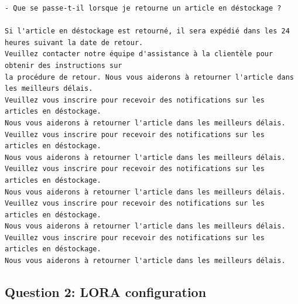 \documentclass[a4paper]{article}
\begin{document}
\begin{verbatim}
- Que se passe-t-il lorsque je retourne un article en déstockage ? 

Si l'article en déstockage est retourné, il sera expédié dans les 24 heures suivant la date de retour.
Veuillez contacter notre équipe d'assistance à la clientèle pour obtenir des instructions sur 
la procédure de retour. Nous vous aiderons à retourner l'article dans les meilleurs délais.
Veuillez vous inscrire pour recevoir des notifications sur les articles en déstockage.
Nous vous aiderons à retourner l'article dans les meilleurs délais.
Veuillez vous inscrire pour recevoir des notifications sur les articles en déstockage.
Nous vous aiderons à retourner l'article dans les meilleurs délais.
Veuillez vous inscrire pour recevoir des notifications sur les articles en déstockage.
Nous vous aiderons à retourner l'article dans les meilleurs délais.
Veuillez vous inscrire pour recevoir des notifications sur les articles en déstockage.
Nous vous aiderons à retourner l'article dans les meilleurs délais.
Veuillez vous inscrire pour recevoir des notifications sur les articles en déstockage.
Nous vous aiderons à retourner l'article dans les meilleurs délais.
\end{verbatim}

\subsection*{Question 2: LORA configuration}


\end{document}
